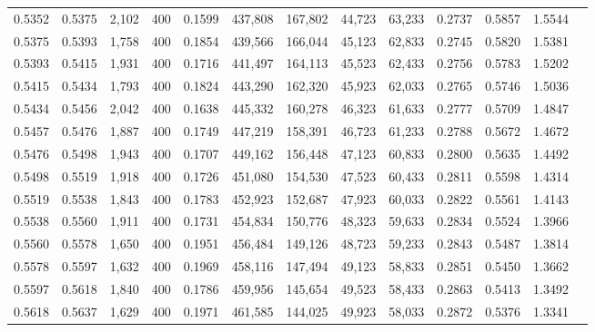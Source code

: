 \begin{tabular}{rrrrrrrrrrrrr}
0.5352 & 0.5375 &  2,102 & 400 &                                     0.1599 & 437,808 & 167,802 &  44,723 &  63,233 & 0.2737 & 0.5857 & 1.5544 \\
0.5375 & 0.5393 &  1,758 & 400 &                                     0.1854 & 439,566 & 166,044 &  45,123 &  62,833 & 0.2745 & 0.5820 & 1.5381 \\
0.5393 & 0.5415 &  1,931 & 400 &                                     0.1716 & 441,497 & 164,113 &  45,523 &  62,433 & 0.2756 & 0.5783 & 1.5202 \\
0.5415 & 0.5434 &  1,793 & 400 &                                     0.1824 & 443,290 & 162,320 &  45,923 &  62,033 & 0.2765 & 0.5746 & 1.5036 \\
0.5434 & 0.5456 &  2,042 & 400 &                                     0.1638 & 445,332 & 160,278 &  46,323 &  61,633 & 0.2777 & 0.5709 & 1.4847 \\
0.5457 & 0.5476 &  1,887 & 400 &                                     0.1749 & 447,219 & 158,391 &  46,723 &  61,233 & 0.2788 & 0.5672 & 1.4672 \\
0.5476 & 0.5498 &  1,943 & 400 &                                     0.1707 & 449,162 & 156,448 &  47,123 &  60,833 & 0.2800 & 0.5635 & 1.4492 \\
0.5498 & 0.5519 &  1,918 & 400 &                                     0.1726 & 451,080 & 154,530 &  47,523 &  60,433 & 0.2811 & 0.5598 & 1.4314 \\
0.5519 & 0.5538 &  1,843 & 400 &                                     0.1783 & 452,923 & 152,687 &  47,923 &  60,033 & 0.2822 & 0.5561 & 1.4143 \\
0.5538 & 0.5560 &  1,911 & 400 &                                     0.1731 & 454,834 & 150,776 &  48,323 &  59,633 & 0.2834 & 0.5524 & 1.3966 \\
0.5560 & 0.5578 &  1,650 & 400 &                                     0.1951 & 456,484 & 149,126 &  48,723 &  59,233 & 0.2843 & 0.5487 & 1.3814 \\
0.5578 & 0.5597 &  1,632 & 400 &                                     0.1969 & 458,116 & 147,494 &  49,123 &  58,833 & 0.2851 & 0.5450 & 1.3662 \\
0.5597 & 0.5618 &  1,840 & 400 &                                     0.1786 & 459,956 & 145,654 &  49,523 &  58,433 & 0.2863 & 0.5413 & 1.3492 \\
0.5618 & 0.5637 &  1,629 & 400 &                                     0.1971 & 461,585 & 144,025 &  49,923 &  58,033 & 0.2872 & 0.5376 & 1.3341 \\

\end{tabular}
